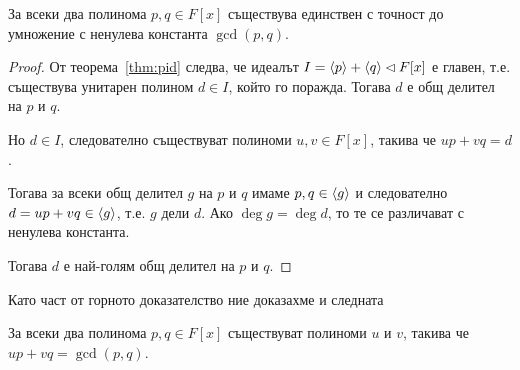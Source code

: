 \documentclass[numbers=endperiod, DIV=15, bibliography=totocnumbered]{scrartcl}
\begin{document}
\begin{theorem}
  За всеки два полинома $p, q \in F[x]$ съществува единствен с точност до умножение с ненулева константа $\gcd(p, q)$.
\end{theorem}
\begin{proof}
  От теорема~\ref{thm:pid} следва, че идеалът $I = \left\langle p \right\rangle + \left\langle q \right\rangle \lhd F[x]$ е главен, т.е. съществува унитарен полином $d \in I$, който го поражда.
  Тогава $d$ е общ делител на $p$ и $q$.

  Но $d \in I$, следователно съществуват полиноми $u, v \in F[x]$, такива че $u p + v q = d$.

  Тогава за всеки общ делител $g$ на $p$ и $q$ имаме $p, q \in \left\langle g \right\rangle$ и следователно $d = u p + v q \in \left\langle g \right\rangle$, т.е. $g$ дели $d$. Ако $\deg g = \deg d$, то те се различават с ненулева константа.

  Тогава $d$ е най-голям общ делител на $p$ и $q$.
\end{proof}

Като част от горното доказателство ние доказахме и следната
\begin{theorem}
  За всеки два полинома $p, q \in F[x]$ съществуват полиноми $u$ и $v$, такива че $u p + v q = \gcd(p, q)$.
\end{theorem}
\end{document}
